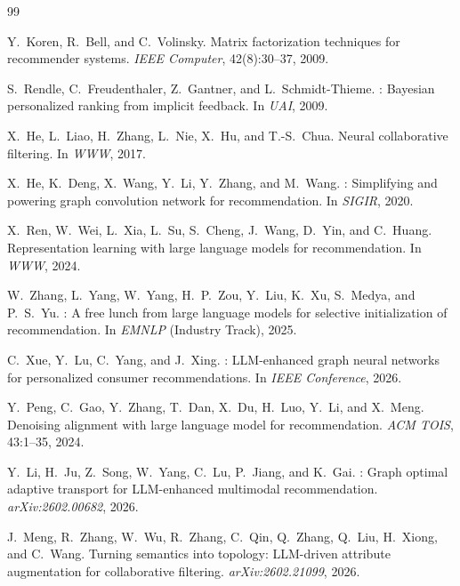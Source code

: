 \documentclass[11pt,a4paper]{article}
\begin{document}
\begin{thebibliography}{99}

Y.~Koren, R.~Bell, and C.~Volinsky.
\newblock Matrix factorization techniques for recommender systems.
\newblock \emph{IEEE Computer}, 42(8):30--37, 2009.

S.~Rendle, C.~Freudenthaler, Z.~Gantner, and L.~Schmidt-Thieme.
: {B}ayesian personalized ranking from implicit feedback.
\newblock In \emph{UAI}, 2009.

X.~He, L.~Liao, H.~Zhang, L.~Nie, X.~Hu, and T.-S.~Chua.
\newblock Neural collaborative filtering.
\newblock In \emph{WWW}, 2017.

X.~He, K.~Deng, X.~Wang, Y.~Li, Y.~Zhang, and M.~Wang.
: Simplifying and powering graph convolution network for recommendation.
\newblock In \emph{SIGIR}, 2020.

X.~Ren, W.~Wei, L.~Xia, L.~Su, S.~Cheng, J.~Wang, D.~Yin, and C.~Huang.
\newblock Representation learning with large language models for recommendation.
\newblock In \emph{WWW}, 2024.

W.~Zhang, L.~Yang, W.~Yang, H.~P.~Zou, Y.~Liu, K.~Xu, S.~Medya, and P.~S.~Yu.
: A free lunch from large language models for selective initialization of recommendation.
\newblock In \emph{EMNLP} (Industry Track), 2025.

C.~Xue, Y.~Lu, C.~Yang, and J.~Xing.
: {LLM}-enhanced graph neural networks for personalized consumer recommendations.
\newblock In \emph{IEEE Conference}, 2026.

Y.~Peng, C.~Gao, Y.~Zhang, T.~Dan, X.~Du, H.~Luo, Y.~Li, and X.~Meng.
\newblock Denoising alignment with large language model for recommendation.
\newblock \emph{ACM TOIS}, 43:1--35, 2024.

Y.~Li, H.~Ju, Z.~Song, W.~Yang, C.~Lu, P.~Jiang, and K.~Gai.
: Graph optimal adaptive transport for {LLM}-enhanced multimodal recommendation.
\newblock \emph{arXiv:2602.00682}, 2026.

J.~Meng, R.~Zhang, W.~Wu, R.~Zhang, C.~Qin, Q.~Zhang, Q.~Liu, H.~Xiong, and C.~Wang.
\newblock Turning semantics into topology: {LLM}-driven attribute augmentation for collaborative filtering.
\newblock \emph{arXiv:2602.21099}, 2026.


\end{thebibliography}
\end{document}
